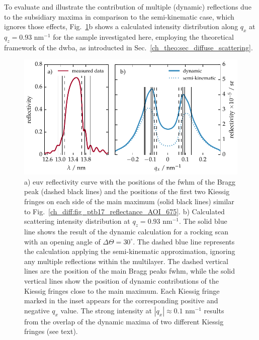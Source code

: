 To evaluate and illustrate the contribution of multiple (dynamic) reflections due to the subsidiary maxima in comparison to the semi-kinematic case, which ignores those effects, Fig.~\ref{ch_diff:fig_kiessig_like_peak_along_qx}b shows a calculated intensity distribution along $q_x$ at $q_z=0.93$ nm$^{-1}$ for the sample investigated here, employing the theoretical framework of the \gls{dwba}, as introducted in Sec.~\ref{ch_theo:sec_diffuse_scattering}.
\begin{figure}[htbp]
        \includegraphics[width=\textwidth]{img/qx_kinematic_vs_dynamic}
        \caption[Calculated diffuse scattering intensity distribution at $q_z=0.93$ nm$^{-1}$ for the Mo/B$_4$C/Si/C mirror.]{a) \gls{euv} reflectivity curve with the positions of the \gls{fwhm} of the Bragg peak (dashed black lines) and the positions of the first two Kiessig fringes on each side of the main maximum (solid black lines) similar to Fig.~\ref{ch_diff:fig_ptb17_reflectance_AOI_675}. b) Calculated scattering intensity distribution at $q_z=0.93$ nm$^{-1}$. The solid blue line shows the result of the dynamic calculation for a rocking scan with an opening angle of $\Delta\Theta=30^\circ$. The dashed blue line represents the calculation applying the semi-kinematic approximation, ignoring any multiple reflections within the multilayer. The dashed vertical lines are the position of the main Bragg peaks \gls{fwhm}, while the solid vertical lines show the position of dynamic contributions of the Kiessig fringes close to the main maximum. Each Kiessig fringe marked in the inset appears for the corresponding positive and negative $q_x$ value. The strong intensity at $|q_x|\approx0.1$ nm$^{-1}$ results from the overlap of the dynamic maxima of two different Kiessig fringes (see text).} \label{ch_diff:fig_kiessig_like_peak_along_qx} 
\end{figure}
